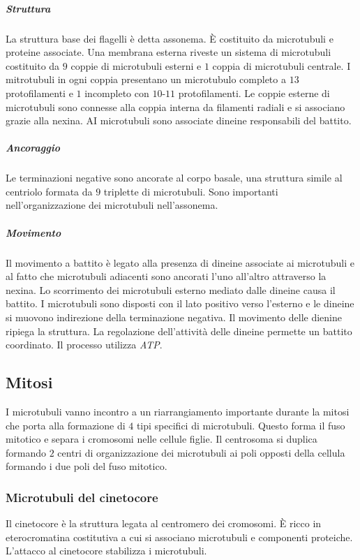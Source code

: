 				\subparagraph{Struttura}
				La struttura base dei flagelli \`e detta assonema.
				\`E costituito da microtubuli e proteine associate.
				Una membrana esterna riveste un sistema di microtubuli costituito da $9$ coppie di microtubuli esterni e $1$ coppia di microtubuli centrale.
				I mitrotubuli in ogni coppia presentano un microtubulo completo a $13$ protofilamenti e $1$ incompleto con $10$-$11$ protofilamenti.
				Le coppie esterne di microtubuli sono connesse alla coppia interna da filamenti radiali e si associano grazie alla nexina.
				AI microtubuli sono associate dineine responsabili del battito.

				\subparagraph{Ancoraggio}
				Le terminazioni negative sono ancorate al corpo basale, una struttura simile al centriolo formata da $9$ triplette di microtubuli.
				Sono importanti nell'organizzazione dei microtubuli nell'assonema.

				\subparagraph{Movimento}
				Il movimento a battito \`e legato alla presenza di dineine associate ai microtubuli e al fatto che microtubuli adiacenti sono ancorati l'uno all'altro attraverso la nexina.
				Lo scorrimento dei microtubuli esterno mediato dalle dineine causa il battito.
				I microtubuli sono disposti con il lato positivo verso l'esterno e le dineine si muovono indirezione della terminazione negativa.
				Il movimento delle dienine ripiega la struttura.
				La regolazione dell'attivit\`a delle dineine permette un battito coordinato.
				Il processo utilizza \emph{ATP}.

	\subsection{Mitosi}
	I microtubuli vanno incontro a un riarrangiamento importante durante la mitosi che porta alla formazione di $4$ tipi specifici di microtubuli.
	Questo forma il fuso mitotico e separa i cromosomi nelle cellule figlie.
	Il centrosoma si duplica formando $2$ centri di organizzazione dei microtubuli ai poli opposti della cellula formando i due poli del fuso mitotico.

		\subsubsection{Microtubuli del cinetocore}
		Il cinetocore \`e la struttura legata al centromero dei cromosomi.
		\`E ricco in eterocromatina costitutiva a cui si associano microtubuli e componenti proteiche.
		L'attacco al cinetocore stabilizza i microtubuli.

